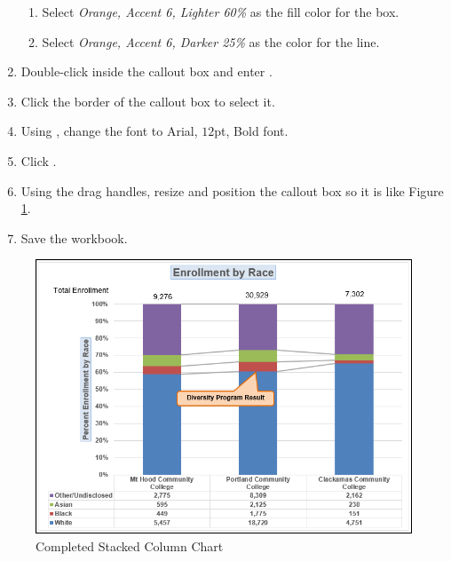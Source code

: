 \begin{enumbox}
\begin{enumerate}
		\begin{enumerate}
			\item Select \textit{Orange, Accent 6, Lighter 60\%} as the fill color for the box.
			\item Select \textit{Orange, Accent 6, Darker 25\%} as the color for the line.
		\end{enumerate}
		
		\item Double-click inside the callout box and enter .
		\item Click the border of the callout box to select it.
		\item Using , change the font to Arial, $ 12 $pt, Bold font. 
		\item Click .
		\item Using the drag handles, resize and position the callout box so it is like Figure \ref{04:fig45}.
		\item Save the  workbook.
	\end{enumerate}
\end{enumbox}
	
\begin{figure}[H]
	\centering
	\includegraphics[width=\maxwidth{.95\linewidth}]{gfx/ch04_fig45}
	\caption{Completed Stacked Column Chart}
	\label{04:fig45}
\end{figure}

